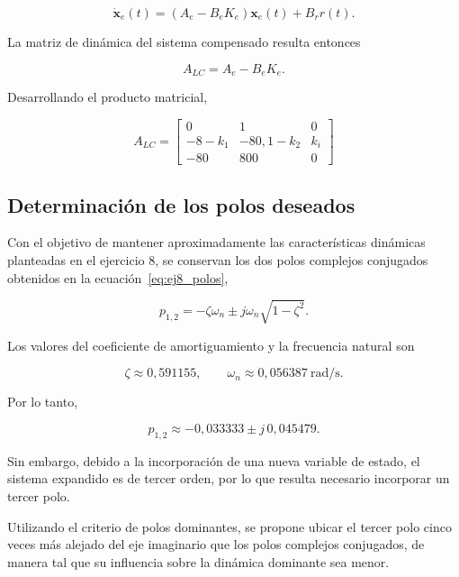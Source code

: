\documentclass[10pt]{article}
\begin{document}
\begin{equation}
    \dot{\mathbf{x}}_e(t)=
    (A_e-B_eK_e)\mathbf{x}_e(t)+B_rr(t).
\end{equation}

La matriz de dinámica del sistema compensado
resulta entonces

\begin{equation}
    A_{LC}=A_e-B_eK_e.
\end{equation}

Desarrollando el producto matricial,

\begin{equation}
    \boxed{
        A_{LC}=
        \begin{bmatrix}
            0 & 1 & 0\\
            -8-k_1 & -80{,}1-k_2 & k_i\\
            -80 & 800 & 0
        \end{bmatrix}
    }
\end{equation}


\subsection{Determinación de los polos deseados}

Con el objetivo de mantener aproximadamente las
características dinámicas planteadas en el ejercicio 8,
se conservan los dos polos complejos conjugados
obtenidos en la ecuación~\eqref{eq:ej8_polos},

\begin{equation}
    p_{1,2}=
    -\zeta\omega_n
    \pm j\omega_n\sqrt{1-\zeta^2}.
\end{equation}

Los valores del coeficiente de amortiguamiento
y la frecuencia natural son

\begin{equation}
    \zeta\approx0{,}591155,
    \qquad
    \omega_n\approx0{,}056387\ \text{rad/s}.
\end{equation}

Por lo tanto,

\begin{equation}
    p_{1,2}\approx
    -0{,}033333\pm j\,0{,}045479.
\end{equation}

Sin embargo, debido a la incorporación de una nueva
variable de estado, el sistema expandido es de tercer
orden, por lo que resulta necesario incorporar un
tercer polo.

Utilizando el criterio de polos dominantes, se propone
ubicar el tercer polo cinco veces más alejado del
eje imaginario que los polos complejos conjugados,
de manera tal que su influencia sobre la dinámica
dominante sea menor.
\end{document}

